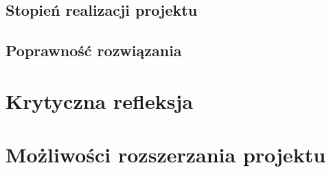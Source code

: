 \documentclass[12pt, oneside]{report}
\theoremstyle{definition}
\begin{document}
\subsection{Stopień realizacji projektu}
\subsection{Poprawność rozwiązania}
\section{Krytyczna refleksja}
\section{Możliwości rozszerzania projektu}

	
\pagestyle{plain}
\end{document}

